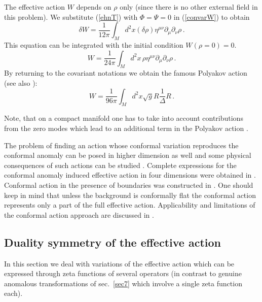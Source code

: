 The effective action $W$ depends on $\rho$ only (since there is no other
external field in this problem). We substitute (\ref{ehnT}) with
$\Phi =\Psi =0$ in (\ref{convarW}) to obtain
\begin{equation}
\delta W = \frac 1{12\pi} \int_M d^2x (\delta\rho) \eta^{\mu\nu}
\partial_\mu\partial_\nu \rho \,.\label{cgcvar}
\end{equation}
This equation can be integrated with the initial condition
$W(\rho =0)=0$. 
\begin{equation}
W=\frac 1{24\pi} \int_M d^2x\,\rho \eta^{\mu\nu}
\partial_\mu\partial_\nu \rho \,.\label{caction}
\end{equation}
By returning to the covariant notations we obtain the famous
Polyakov action \cite{Polyakov:1981rd} (see also 
\cite{Luscher:1980fr}):
\begin{equation}
W=\frac 1{96\pi} \int_M d^2x \sqrt{g} R\frac 1\Delta R \,.
\label{Polaction}
\end{equation}

Note, that on a compact manifold one has to take into account contributions
from the zero modes which lead to an additional term in the Polyakov action
\cite{Dowker:1994rt}.

The problem of finding an action whose conformal variation reproduces
the conformal anomaly can be posed
in higher dimension as well \cite{Deser:1976yx} and some physical consequences
of such actions can be studied \cite{Frolov:1979tu,Frolov:1981mz}.
Complete expressions for the conformal anomaly induced effective action
in four dimensions were obtained in \cite{Riegert:1984kt,Buchbinder:1986dc}.
Conformal action in the presence of boundaries was constructed in
\cite{Dowker:1990ue}. One should keep in mind that unless the
background is conformally flat the conformal action represents only
a part of the full effective action. Applicability and limitations
of the conformal action approach are discussed in 
\cite{Erdmenger:1997yc,Balbinot:1999vg,Gusev:1999cv}.
\subsection{Duality symmetry of the effective action}\label{s9dual}
In this section we deal with variations of the effective action
which can be expressed through zeta functions of several operators
(in contrast to genuine anomalous transformations of sec.\ \ref{sec7}
which involve a single zeta function each).

